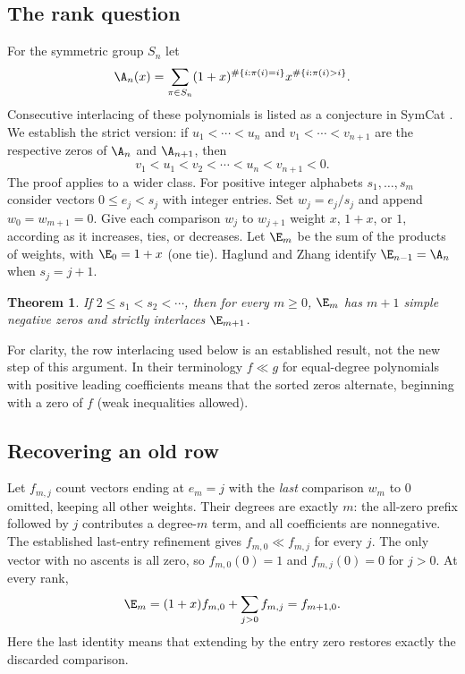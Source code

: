 \documentclass[11pt,a4paper]{article}
\numberwithin{equation}{section}
\newtheorem{theorem}{Theorem}[section]
\theoremstyle{definition}
\theoremstyle{remark}
\begin{document}
\subsection{The rank question}
For the symmetric group $S_n$ let
\[
 \A_n(x)=\sum_{\pi\in S_n}(1+x)^{\#\{i:\pi(i)=i\}}x^{\#\{i:\pi(i)>i\}}.
\]
Consecutive interlacing of these polynomials is listed as a conjecture in SymCat \cite{r32keio:symcat}. We establish the strict version: if $u_1<\cdots<u_n$ and $v_1<\cdots<v_{n+1}$ are the respective zeros of $\A_n$ and $\A_{n+1}$, then
\[
 v_1<u_1<v_2<\cdots<u_n<v_{n+1}<0.
\]
The proof applies to a wider class. For positive integer alphabets $s_1,\ldots,s_m$ consider vectors $0\le e_j<s_j$ with integer entries. Set $w_j=e_j/s_j$ and append $w_0=w_{m+1}=0$. Give each comparison $w_j$ to $w_{j+1}$ weight $x$, $1+x$, or $1$, according as it increases, ties, or decreases. Let $\E_m$ be the sum of the products of weights, with $\E_0=1+x$ (one tie). Haglund and Zhang \cite[Theorem 3.1 and its proof]{r32keio:hz} identify $\E_{n-1}=\A_n$ when $s_j=j+1$.

\begin{theorem}\label{r32keio:main}
If $2\le s_1<s_2<\cdots$, then for every $m\ge0$, $\E_m$ has $m+1$ simple negative zeros and strictly interlaces $\E_{m+1}$.
\end{theorem}
For clarity, the row interlacing used below is an established result, not the new step of this argument. In their terminology $f\ll g$ for equal-degree polynomials with positive leading coefficients means that the sorted zeros alternate, beginning with a zero of $f$ (weak inequalities allowed).
\subsection{Recovering an old row}
Let $f_{m,j}$ count vectors ending at $e_m=j$ with the \emph{last} comparison $w_m$ to $0$ omitted, keeping all other weights. Their degrees are exactly $m$: the all-zero prefix followed by $j$ contributes a degree-$m$ term, and all coefficients are nonnegative. The established last-entry refinement \cite[Theorem 1.1]{r32keio:hz} gives $f_{m,0}\ll f_{m,j}$ for every $j$. The only vector with no ascents is all zero, so $f_{m,0}(0)=1$ and $f_{m,j}(0)=0$ for $j>0$. At every rank,
\begin{equation}
 \E_m=(1+x)f_{m,0}+\sum_{j>0}f_{m,j}=f_{m+1,0}.\label{r32keio:eq:first}
\end{equation}
Here the last identity means that extending by the entry zero restores exactly the discarded comparison.
\end{document}
